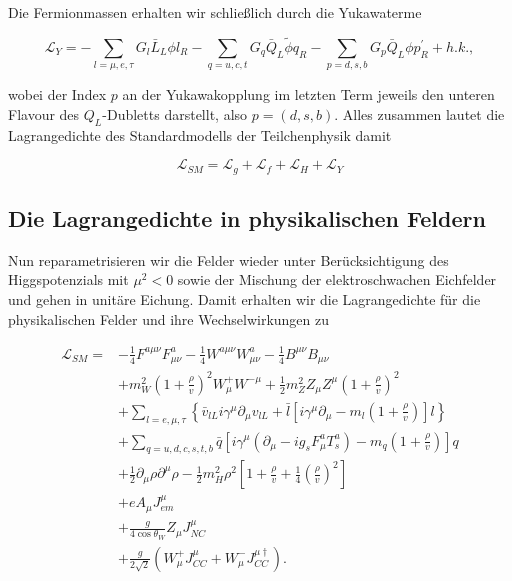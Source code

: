 \documentclass[10pt, letterpaper]{article}
\begin{document}
Die Fermionmassen erhalten wir schließlich durch die Yukawaterme

$$
\mathscr{L}_{Y}=-\sum_{l=\mu, e, \tau} G_{l} \bar{L}_{L} \phi l_{R}-\sum_{q=u, c, t} G_{q} \bar{Q}_{L} \tilde{\phi} q_{R}-\sum_{p=d, s, b} G_{p} \bar{Q}_{L} \phi p_{R}^{\prime}+h . k .,
$$

wobei der Index $p$ an der Yukawakopplung im letzten Term jeweils den unteren Flavour des $Q_{L}$-Dubletts darstellt, also $p=(d, s, b)$. Alles zusammen lautet die Lagrangedichte des Standardmodells der Teilchenphysik damit

$$
\mathscr{L}_{S M}=\mathscr{L}_{g}+\mathscr{L}_{f}+\mathscr{L}_{H}+\mathscr{L}_{Y}
$$

\subsection*{Die Lagrangedichte in physikalischen Feldern}
Nun reparametrisieren wir die Felder wieder unter Berücksichtigung des Higgspotenzials mit $\mu^{2}<0$ sowie der Mischung der elektroschwachen Eichfelder und gehen in unitäre Eichung. Damit erhalten wir die Lagrangedichte für die physikalischen Felder und ihre Wechselwirkungen zu

$$
\begin{aligned}
\mathscr{L}_{S M}= & -\frac{1}{4} F^{a \mu \nu} F_{\mu \nu}^{a}-\frac{1}{4} W^{a \mu \nu} W_{\mu \nu}^{a}-\frac{1}{4} B^{\mu \nu} B_{\mu \nu} \\
& +m_{W}^{2}\left(1+\frac{\rho}{v}\right)^{2} W_{\mu}^{+} W^{-\mu}+\frac{1}{2} m_{Z}^{2} Z_{\mu} Z^{\mu}\left(1+\frac{\rho}{v}\right)^{2} \\
& +\sum_{l=e, \mu, \tau}\left\{\bar{v}_{l L} i \gamma^{\mu} \partial_{\mu} v_{l L}+\bar{l}\left[i \gamma^{\mu} \partial_{\mu}-m_{l}\left(1+\frac{\rho}{v}\right)\right] l\right\} \\
& +\sum_{q=u, d, c, s, t, b} \bar{q}\left[i \gamma^{\mu}\left(\partial_{\mu}-i g_{s} F_{\mu}^{a} T_{s}^{a}\right)-m_{q}\left(1+\frac{\rho}{v}\right)\right] q \\
& +\frac{1}{2} \partial_{\mu} \rho \partial^{\mu} \rho-\frac{1}{2} m_{H}^{2} \rho^{2}\left[1+\frac{\rho}{v}+\frac{1}{4}\left(\frac{\rho}{v}\right)^{2}\right] \\
& +e A_{\mu} J_{e m}^{\mu} \\
& +\frac{g}{4 \cos \theta_{W}} Z_{\mu} J_{N C}^{\mu} \\
& +\frac{g}{2 \sqrt{2}}\left(W_{\mu}^{+} J_{C C}^{\mu}+W_{\mu}^{-} J_{C C}^{\mu \dagger}\right) .
\end{aligned}
$$
\end{document}
